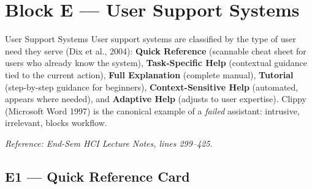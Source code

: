 \documentclass[12pt, a4paper]{article}
\begin{document}
\vspace{0.5cm}

\section{Block E --- User Support Systems}

\begin{hcibox}{User Support Systems}
User support systems are classified by the type of user need they serve (Dix et al., 2004): \textbf{Quick Reference} (scannable cheat sheet for users who already know the system), \textbf{Task-Specific Help} (contextual guidance tied to the current action), \textbf{Full Explanation} (complete manual), \textbf{Tutorial} (step-by-step guidance for beginners), \textbf{Context-Sensitive Help} (automated, appears where needed), and \textbf{Adaptive Help} (adjusts to user expertise). Clippy (Microsoft Word 1997) is the canonical example of a \emph{failed} assistant: intrusive, irrelevant, blocks workflow.

\textit{Reference: End-Sem HCI Lecture Notes, lines 299--425.}
\end{hcibox}

\subsection{E1 --- Quick Reference Card}
\end{document}
